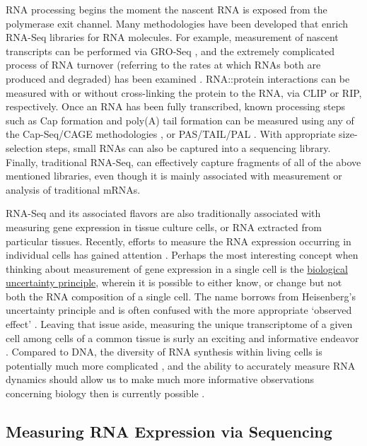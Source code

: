 RNA processing begins the moment the nascent RNA is exposed from the polymerase exit channel. Many methodologies have been developed that enrich RNA-Seq libraries for RNA molecules. For example, measurement of nascent transcripts can be performed via GRO-Seq \citep{Core2008a}, and the extremely complicated process of RNA turnover (referring to the rates at which RNAs both are produced and degraded) has been examined \citep{Ghosh2010a, Tani2012}. RNA::protein interactions can be measured with or without cross-linking the protein to the RNA, via CLIP or RIP, respectively. Once an RNA has been fully transcribed, known processing steps such as Cap formation and poly(A) tail formation can be measured using any of the Cap-Seq/CAGE methodologies \citep{Shiraki2003a}, or PAS/TAIL/PAL \citep{Shepard2011, Chang2014b, Subtelny2014}. With appropriate size-selection steps, small RNAs \citep{Ghildiyal2008} can also be captured into a sequencing library. Finally, traditional RNA-Seq, can effectively capture fragments of all of the above mentioned libraries, even though it is mainly associated with measurement or analysis of traditional mRNAs.

RNA-Seq and its associated flavors are also traditionally associated with measuring gene expression in tissue culture cells, or RNA extracted from particular tissues. Recently, efforts to measure the RNA expression occurring in individual cells has gained attention \citep{Shapiro2013b}. Perhaps the most interesting concept when thinking about measurement of gene expression in a single cell is the \underline{biological uncertainty principle}, wherein it is possible to either know, or change \textemdash but not both \textemdash the RNA composition of a single cell. The name borrows from Heisenberg's uncertainty principle \citep{Kennard1927} and is often confused with the more appropriate ‘observed effect’ \citep{Riley2013}. Leaving that issue aside, measuring the unique transcriptome of a given cell among cells of a common tissue is surly an exciting and informative endeavor \citep{Marinov2013, Shalek2013b,Wills2013}. Compared to DNA, the diversity of RNA synthesis within living cells is potentially much more complicated \citep{Shendure2012}, and the ability to accurately measure RNA dynamics should allow us to make much more informative observations concerning biology then is currently possible \citep{Djebali2012}.

\subsection{Measuring RNA Expression via Sequencing}

